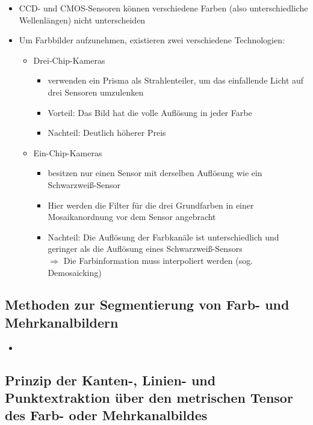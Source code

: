 \documentclass[11pt]{article}
\begin{document}
\begin{itemize}
    \item CCD- und CMOS-Sensoren können verschiedene Farben (also unterschiedliche Wellenlängen) nicht unterscheiden
    \item Um Farbbilder aufzunehmen, existieren zwei verschiedene Technologien:
        \begin{itemize}
            \item Drei-Chip-Kameras
            \begin{itemize}
                \item verwenden ein Prisma als Strahlenteiler, um das einfallende Licht auf drei Sensoren umzulenken
                \item Vorteil: Das Bild hat die volle Auflösung in jeder Farbe
                \item Nachteil: Deutlich höherer Preis
            \end{itemize}
            \item Ein-Chip-Kameras 
            \begin{itemize}
                \item besitzen nur einen Sensor mit derselben Auflösung wie ein Schwarzweiß-Sensor
                \item Hier werden die Filter für die drei Grundfarben in einer Mosaikanordnung vor dem Sensor angebracht
                \item Nachteil: Die Auflösung der Farbkanäle ist unterschiedlich und geringer als die Auflösung eines Schwarzweiß-Sensors
                \\ $\Rightarrow$ Die Farbinformation muss interpoliert werden (sog. Demosaicking)
            \end{itemize}
        \end{itemize}
\end{itemize}

\subsection{Methoden zur Segmentierung von Farb- und Mehrkanalbildern}

\begin{itemize}
    \item 
\end{itemize}

\subsection{Prinzip der Kanten-, Linien- und Punktextraktion über den metrischen Tensor des Farb- oder Mehrkanalbildes}
\end{document}
